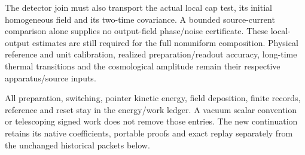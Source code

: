 The detector join must also transport the actual local cap test, its
initial homogeneous field and its two-time covariance. A bounded
source-current comparison alone supplies no output-field phase/noise
certificate. These local-output estimates are still required for the full
nonuniform composition. Physical reference and unit calibration, realized
preparation/readout accuracy, long-time thermal transitions and the
cosmological amplitude remain their respective apparatus/source inputs.

All preparation, switching, pointer kinetic energy, field deposition,
finite records, reference and reset stay in the energy/work ledger.
A vacuum scalar convention or telescoping signed work does not remove
those entries. The new continuation retains its native coefficients,
portable proofs and exact replay separately from the unchanged historical
packets below.
